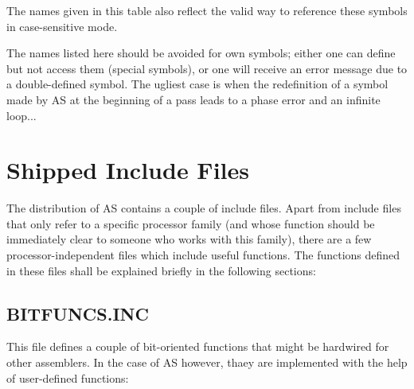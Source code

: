 \documentclass[12pt,twoside]{report}
\begin{document}
The names given in this table also reflect the valid way to reference
these symbols in case-sensitive mode.

The names listed here should be avoided for own symbols; either one
can define but not access them (special symbols), or one will receive
an error message due to a double-defined symbol.  The ugliest case is
when the redefinition of a symbol made by AS at the beginning of a
pass leads to a phase error and an infinite loop...


\cleardoublepage
\chapter{Shipped Include Files}

The distribution of AS contains a couple of include files.  Apart from
include files that only refer to a specific processor family (and whose
function should be immediately clear to someone who works with this
family), there are a few processor-independent files which include useful
functions.  The functions defined in these files shall be explained
briefly in the following sections:

\section{BITFUNCS.INC}

This file defines a couple of bit-oriented functions that might be
hardwired for other assemblers.  In the case of AS however, thaey are
implemented with the help of user-defined functions:
\end{document}
